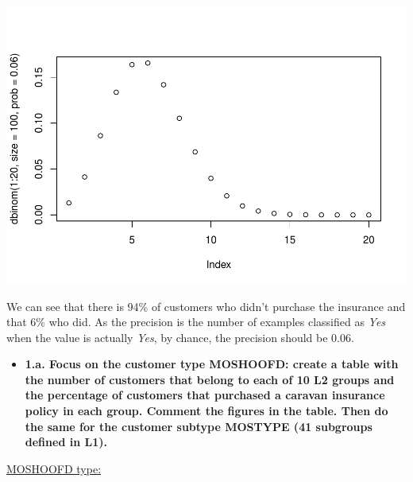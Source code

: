 \documentclass[
  12pt,
  oneside]{report}
\newenvironment{Shaded}{\begin{snugshade}}{\end{snugshade}}
\newcommand{\DataTypeTok}[1]{\textcolor[rgb]{0.13,0.29,0.53}{#1}}
\newcommand{\DecValTok}[1]{\textcolor[rgb]{0.00,0.00,0.81}{#1}}
\newcommand{\KeywordTok}[1]{\textcolor[rgb]{0.13,0.29,0.53}{\textbf{#1}}}
\newcommand{\NormalTok}[1]{#1}
\newcommand{\OperatorTok}[1]{\textcolor[rgb]{0.81,0.36,0.00}{\textbf{#1}}}
\newcommand{\StringTok}[1]{\textcolor[rgb]{0.31,0.60,0.02}{#1}}
\providecommand{\tightlist}{%
  \setlength{\itemsep}{0pt}\setlength{\parskip}{0pt}}
\begin{document}
\includegraphics{leroy_francois_hw2_files/figure-latex/unnamed-chunk-6-1.pdf}

We can see that there is 94\% of customers who didn't purchase the insurance and that 6\% who did. As the precision is the number of examples classified as \emph{Yes} when the value is actually \emph{Yes}, by chance, the precision should be 0.06.

\begin{itemize}
\tightlist
\item
  \textbf{1.a. Focus on the customer type MOSHOOFD: create a table with the number of customers that belong to each of 10 L2 groups and the percentage of customers that purchased a caravan insurance policy in each group. Comment the figures in the table. Then do the same for the customer subtype MOSTYPE (41 subgroups defined in L1).}
\end{itemize}

\underline{MOSHOOFD type:}

\begin{Shaded}
\end{Shaded}
\end{document}
